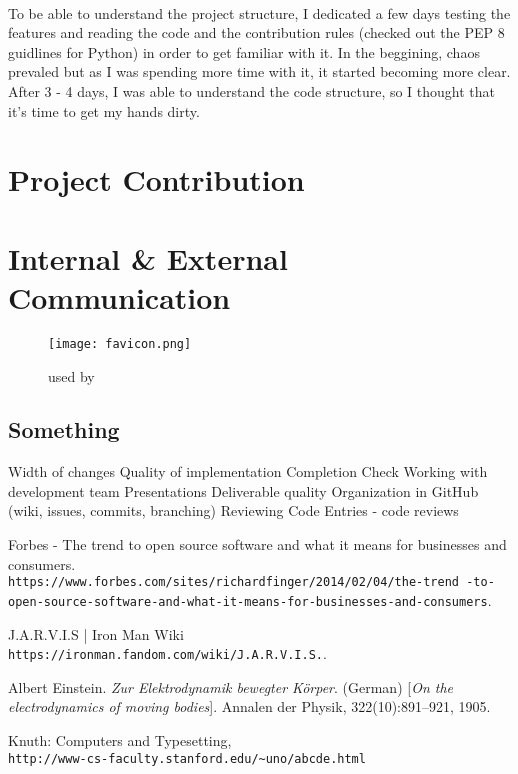 \documentclass[12pt]{article}
\begin{document}
\paragraph{}
  To be able to understand the project structure, I dedicated a few days testing the features and reading the code and the contribution rules (checked out the PEP 8 guidlines for Python) in order to get familiar with it. In the beggining, chaos prevaled but as I was spending more time with it, it started becoming more clear. After 3 - 4 days, I was able to understand the code structure, so I thought that it's time to get my hands dirty.

\section{Project Contribution}

  
  \subsection{}
  
\section{Internal \& External Communication}  
 
\begin{figure}[tph!]
\centerline{\texttt{[image: favicon.png]}}
    \caption{used by}
    \label{fig:verticalcell}
\end{figure}

\subsection{Something}

    Width of changes
    Quality of implementation
    Completion
    Check
    Working with development team
    Presentations
    Deliverable quality
    Organization in GitHub (wiki, issues, commits, branching)
    Reviewing Code Entries - code reviews
    
\begin{thebibliography}{9}

Forbes - The trend to open source software and what it means for businesses and consumers.
\\\texttt{https://www.forbes.com/sites/richardfinger/2014/02/04/the-trend
-to-open-source-software-and-what-it-means-for-businesses-and-consumers}.

J.A.R.V.I.S | Iron Man Wiki
\\\texttt{https://ironman.fandom.com/wiki/J.A.R.V.I.S.}.

Albert Einstein. 
\textit{Zur Elektrodynamik bewegter K{\"o}rper}. (German) 
[\textit{On the electrodynamics of moving bodies}]. 
Annalen der Physik, 322(10):891–921, 1905.
 
Knuth: Computers and Typesetting,
\\\texttt{http://www-cs-faculty.stanford.edu/\~{}uno/abcde.html}
\end{thebibliography}
  
\end{document}
